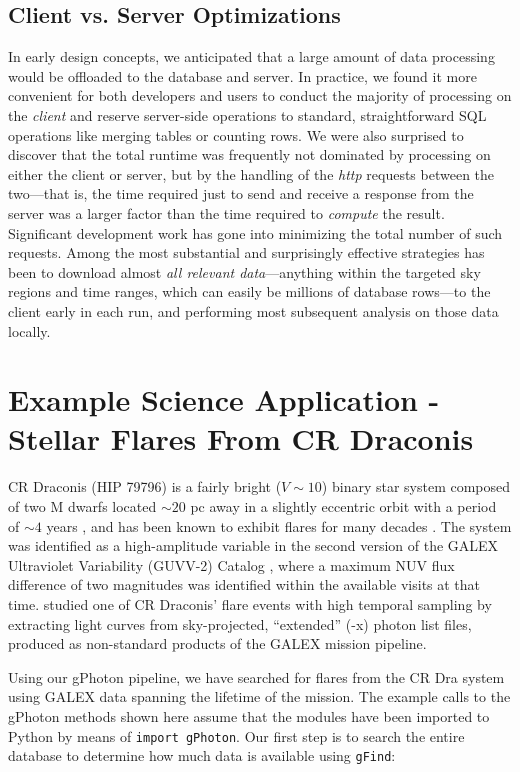 \documentclass[preprint]{aastex}
\begin{document}
\subsection{Client vs. Server Optimizations}
\label{speedopt}
In early design concepts, we anticipated that a large amount of data processing would be offloaded to the database and server. In practice, we found it more convenient for both developers and users to conduct the majority of processing on the \emph{client} and reserve server-side operations to standard, straightforward SQL operations like merging tables or counting rows. We were also surprised to discover that the total runtime was frequently not dominated by processing on either the client or server, but by the handling of the \emph{http} requests between the two---that is, the time required just to send and receive a response from the server was a larger factor than the time required to \emph{compute} the result. Significant development work has gone into minimizing the total number of such requests. Among the most substantial and surprisingly effective strategies has been to download almost \emph{all relevant data}---anything within the targeted sky regions and time ranges, which can easily be millions of database rows---to the client early in each run, and performing most subsequent analysis on those data locally.

\section{Example Science Application - Stellar Flares From CR Draconis}
\label{scienceexamples}
CR Draconis (HIP 79796) is a fairly bright ($V \sim 10$) binary star system composed of two M dwarfs located $\sim 20$ pc away in a slightly eccentric orbit with a period of $\sim 4$ years \citep{tam2008}, and has been known to exhibit flares for many decades \citep{cri1970}. The system was identified as a high-amplitude variable in the second version of the GALEX Ultraviolet Variability (GUVV-2) Catalog \citep{whe2008}, where a maximum NUV flux difference of two magnitudes was identified within the available visits at that time. \citet{wel2006} studied one of CR Draconis' flare events with high temporal sampling by extracting light curves from sky-projected, ``extended'' (-x) photon list files, produced as non-standard products of the GALEX mission pipeline.

Using our gPhoton pipeline, we have searched for flares from the CR Dra system using GALEX data spanning the lifetime of the mission. The example calls to the gPhoton methods shown here assume that the modules have been imported to Python by means of \texttt{import gPhoton}. Our first step is to search the entire database to determine how much data is available using \texttt{gFind}:
\end{document}
